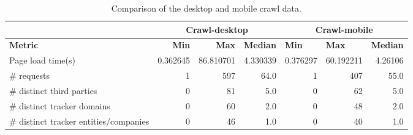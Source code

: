 \begin{table}[ht] 
\caption{Comparison of the desktop and mobile crawl data.} 
\centering 
\begin{tabular}{|l|rrl|lll|} 
\hline 
\textbf{} & \multicolumn{3}{c|}{\textbf{Crawl-desktop}} & \multicolumn{3}{c|}{\textbf{Crawl-mobile}} \\ \hline 
\textbf{Metric} & \multicolumn{1}{r|}{\textbf{Min}} & \multicolumn{1}{r|}{\textbf{Max}} & \textbf{Median} & \multicolumn{1}{l|}{\textbf{Min}} & \multicolumn{1}{l|}{\textbf{Max}} & \textbf{Median} \\ \hline 
Page load time(s) & \multicolumn{1}{r|}{0.362645} & \multicolumn{1}{r|}{86.810701} & \multicolumn{1}{r|}{4.330339} & \multicolumn{1}{r|}{0.376297} & \multicolumn{1}{r|}{60.192211} & \multicolumn{1}{r|}{4.26106} \\ \hline 
\# requests & \multicolumn{1}{r|}{1} & \multicolumn{1}{r|}{597} & \multicolumn{1}{r|}{64.0} & \multicolumn{1}{r|}{1} & \multicolumn{1}{r|}{407} & \multicolumn{1}{r|}{55.0} \\ \hline 
\# distinct third parties & \multicolumn{1}{r|}{0} & \multicolumn{1}{r|}{81} & \multicolumn{1}{r|}{5.0} & \multicolumn{1}{r|}{0} & \multicolumn{1}{r|}{62} & \multicolumn{1}{r|}{5.0} \\ \hline 
\# distinct tracker domains & \multicolumn{1}{r|}{0} & \multicolumn{1}{r|}{60} & \multicolumn{1}{r|}{2.0} & \multicolumn{1}{r|}{0} & \multicolumn{1}{r|}{48} & \multicolumn{1}{r|}{2.0} \\ \hline 
\# distinct tracker entities/companies & \multicolumn{1}{r|}{0} & \multicolumn{1}{r|}{46} & \multicolumn{1}{r|}{1.0} & \multicolumn{1}{r|}{0} & \multicolumn{1}{r|}{40} & \multicolumn{1}{r|}{1.0} \\ \hline 
\end{tabular} 
\label{table:Comparison} 
\end{table}